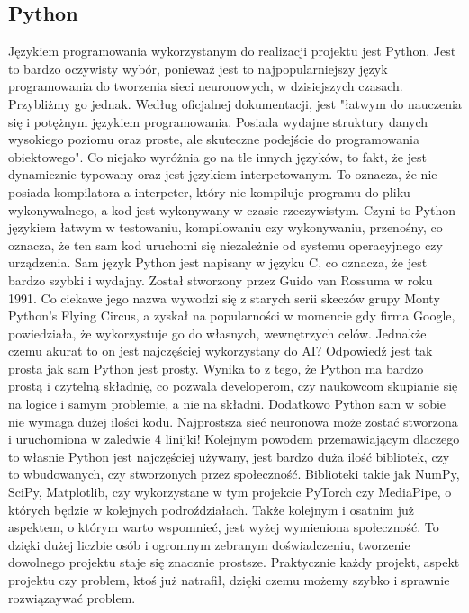 \documentclass[12pt]{article}
\begin{document}
\begin{sloppypar}
{  \subsection{Python}
  {
    Językiem programowania wykorzystanym do realizacji projektu jest Python. 
    Jest to bardzo oczywisty wybór, ponieważ jest to najpopularniejszy język programowania do tworzenia sieci neuronowych, w dzisiejszych czasach.
    Przybliżmy go jednak. Według oficjalnej dokumentacji, jest "łatwym do nauczenia się i potężnym językiem programowania. 
    Posiada wydajne struktury danych wysokiego poziomu oraz proste, ale skuteczne podejście do programowania obiektowego"\cite{python-docs}.
    Co niejako wyróżnia go na tle innych języków, to fakt, że jest dynamicznie typowany oraz jest językiem interpetowanym. 
    To oznacza, że nie posiada kompilatora a interpeter, który nie kompiluje programu do pliku wykonywalnego, a kod jest wykonywany w czasie rzeczywistym.
    Czyni to Python językiem łatwym w testowaniu, kompilowaniu czy wykonywaniu, przenośny, co oznacza, że ten sam kod uruchomi się niezależnie od systemu operacyjnego czy urządzenia.
    Sam język Python jest napisany w języku C, co oznacza, że jest bardzo szybki i wydajny. 
    Został stworzony przez Guido van Rossuma w roku 1991.
    Co ciekawe jego nazwa wywodzi się z starych serii skeczów grupy Monty Python’s Flying Circus, 
    a zyskał na popularności w momencie gdy firma Google, powiedziała, że wykorzystuje go do własnych, wewnętrzych celów.
    \newline
    Jednakże czemu akurat to on jest najczęściej wykorzystany do AI? Odpowiedź jest tak prosta jak sam Python jest prosty.
    Wynika to z tego, że Python ma bardzo prostą i czytelną składnię, co pozwala developerom, czy naukowcom skupianie się na logice i samym problemie, a nie na składni\cite{python-ai}.
    Dodatkowo Python sam w sobie nie wymaga dużej ilości kodu. Najprostsza sieć neuronowa może zostać stworzona i uruchomiona w zaledwie 4 linijki!
    Kolejnym powodem przemawiającym dlaczego to własnie Python jest najczęściej używany, 
    jest bardzo duża ilość bibliotek, czy to wbudowanych, czy stworzonych przez społeczność. 
    Biblioteki takie jak NumPy, SciPy, Matplotlib, czy wykorzystane w tym projekcie PyTorch czy MediaPipe, o których będzie w kolejnych podroździałach.
    Także kolejnym i osatnim już aspektem, o którym warto wspomnieć, jest wyżej wymieniona społeczność. 
    To dzięki dużej liczbie osób i ogromnym zebranym doświadczeniu, tworzenie dowolnego projektu staje się znacznie prostsze. 
    Praktycznie każdy projekt, aspekt projektu czy problem, ktoś już natrafił, dzięki czemu możemy szybko i sprawnie rozwiązaywać problem.
  }
}
\end{sloppypar}
\end{document}
